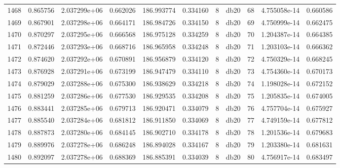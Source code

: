 \begin{tabular}{lrrrrrrlrrr}
1468 &    0.865756 &        2.037299e+06 &  0.662026 &              186.993774 &    0.334160 &       8 &         db20 &     68 &   4.755058e-14 &      0.660586 \\
1469 &    0.867901 &        2.037298e+06 &  0.664171 &              186.984726 &    0.334150 &       8 &         db20 &     69 &   4.750999e-14 &      0.662475 \\
1470 &    0.870297 &        2.037295e+06 &  0.666568 &              186.975128 &    0.334259 &       8 &         db20 &     70 &   1.204387e-14 &      0.664385 \\
1471 &    0.872446 &        2.037293e+06 &  0.668716 &              186.965958 &    0.334248 &       8 &         db20 &     71 &   1.203103e-14 &      0.666362 \\
1472 &    0.874620 &        2.037292e+06 &  0.670891 &              186.956879 &    0.334120 &       8 &         db20 &     72 &   4.750329e-14 &      0.668245 \\
1473 &    0.876928 &        2.037291e+06 &  0.673199 &              186.947479 &    0.334110 &       8 &         db20 &     73 &   4.754360e-14 &      0.670173 \\
1474 &    0.879029 &        2.037288e+06 &  0.675300 &              186.938629 &    0.334218 &       8 &         db20 &     74 &   1.198028e-14 &      0.672152 \\
1475 &    0.881259 &        2.037286e+06 &  0.677530 &              186.929535 &    0.334208 &       8 &         db20 &     75 &   1.205835e-14 &      0.674005 \\
1476 &    0.883441 &        2.037285e+06 &  0.679713 &              186.920471 &    0.334079 &       8 &         db20 &     76 &   4.757704e-14 &      0.675927 \\
1477 &    0.885540 &        2.037284e+06 &  0.681812 &              186.911850 &    0.334069 &       8 &         db20 &     77 &   4.749159e-14 &      0.677812 \\
1478 &    0.887873 &        2.037280e+06 &  0.684145 &              186.902710 &    0.334178 &       8 &         db20 &     78 &   1.201536e-14 &      0.679683 \\
1479 &    0.889976 &        2.037278e+06 &  0.686248 &              186.894028 &    0.334167 &       8 &         db20 &     79 &   1.203380e-14 &      0.681631 \\
1480 &    0.892097 &        2.037278e+06 &  0.688369 &              186.885391 &    0.334039 &       8 &         db20 &     80 &   4.756917e-14 &      0.683497 \\

\end{tabular}
